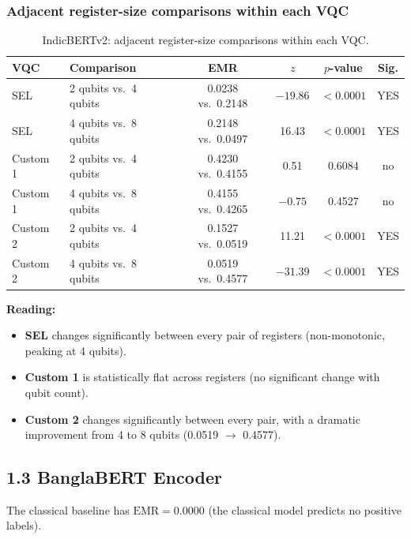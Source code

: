 \documentclass[11pt]{article}
\begin{document}
\subsubsection*{Adjacent register-size comparisons within each VQC}
\begin{table}[h!]
\centering
\small
\begin{threeparttable}
\begin{tabular}{llcccc}
\toprule
\textbf{VQC} & \textbf{Comparison} & \textbf{EMR} & $z$ & $p$-value & \textbf{Sig.} \\
\midrule
SEL     & 2 qubits vs.\ 4 qubits  & 0.0238 vs.\ 0.2148 & $-19.86$ & $<0.0001$ & YES \\
SEL     & 4 qubits vs.\ 8 qubits  & 0.2148 vs.\ 0.0497 & 16.43 & $<0.0001$ & YES \\
\addlinespace
Custom 1 & 2 qubits vs.\ 4 qubits & 0.4230 vs.\ 0.4155 & 0.51 & 0.6084 & no \\
Custom 1 & 4 qubits vs.\ 8 qubits & 0.4155 vs.\ 0.4265 & $-0.75$ & 0.4527 & no \\
\addlinespace
Custom 2 & 2 qubits vs.\ 4 qubits & 0.1527 vs.\ 0.0519 & 11.21 & $<0.0001$ & YES \\
Custom 2 & 4 qubits vs.\ 8 qubits & 0.0519 vs.\ 0.4577 & $-31.39$ & $<0.0001$ & YES \\
\bottomrule
\end{tabular}
\end{threeparttable}
\caption{IndicBERTv2: adjacent register-size comparisons within each VQC.}
\end{table}

\noindent\textbf{Reading:}
\begin{itemize}
    \item \textbf{SEL} changes significantly between every pair of registers (non-monotonic, peaking at 4 qubits).
    \item \textbf{Custom 1} is statistically flat across registers (no significant change with qubit count).
    \item \textbf{Custom 2} changes significantly between every pair, with a dramatic improvement from 4 to 8 qubits
    (0.0519 $\to$ 0.4577).
\end{itemize}

\subsection*{1.3 BanglaBERT Encoder}

The classical baseline has $\text{EMR} = 0.0000$ (the classical model predicts no positive labels).
\end{document}
